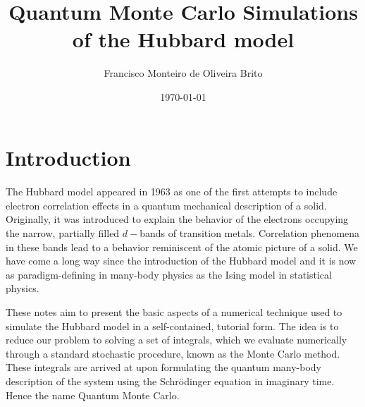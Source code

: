 \documentclass[10pt, twocolumn, twoside]{article}
\title{Quantum Monte Carlo Simulations of the Hubbard model}
\author{Francisco Monteiro de Oliveira Brito}
\date{\today}
\begin{document}

\section{Introduction}\paragraph{}

The Hubbard model appeared in 1963 as one of the first attempts to include electron correlation effects in a quantum mechanical description of a solid. Originally, it was introduced to explain the behavior of the electrons occupying the narrow, partially filled $d-$bands of transition metals. Correlation phenomena in these bands lead to a behavior reminiscent of the atomic picture of a solid. We have come a long way since the introduction of the Hubbard model and it is now as paradigm-defining in many-body physics as the Ising model in statistical physics.

These notes aim to present the basic aspects of a numerical technique used to simulate the Hubbard model in a self-contained, tutorial form. The idea is to reduce our problem to solving a set of integrals, which we evaluate numerically through a standard stochastic procedure, known as the Monte Carlo method. These integrals are arrived at upon formulating the quantum many-body description of the system using the Schr\"odinger equation in imaginary time. Hence the name Quantum Monte Carlo.
\end{document}
